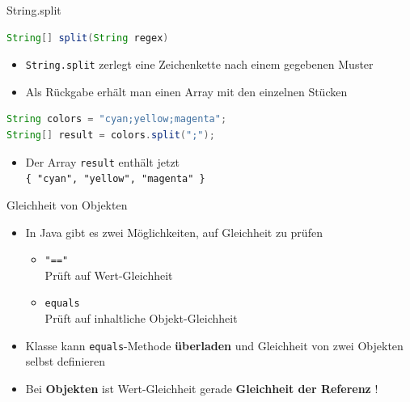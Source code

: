\documentclass[18pt]{beamer}
\begin{document}
\appendix
\beginbackup

\begin{frame}[fragile]{String.split}
    \begin{lstlisting}[language=Java]
String[] split(String regex)
    \end{lstlisting}


    \begin{itemize}
        \item \texttt{String.split} zerlegt eine Zeichenkette nach einem gegebenen Muster
        \item Als Rückgabe erhält man einen Array mit den einzelnen Stücken
    \end{itemize}

\begin{exampleblock}{}
    \begin{lstlisting}[language=Java,basicstyle=\scriptsize]
String colors = "cyan;yellow;magenta";
String[] result = colors.split(";");
    \end{lstlisting}
\end{exampleblock}

\begin{itemize}
    \item Der Array \texttt{result} enthält jetzt\\ \texttt{\{ "cyan", "yellow", "magenta" \}}
\end{itemize}

\end{frame}

\begin{frame}{Gleichheit von Objekten}
    \begin{itemize}
        \item In Java gibt es zwei Möglichkeiten, auf Gleichheit zu prüfen
        \begin{itemize}
            \item \texttt{"=="}\\
            Prüft auf Wert-Gleichheit

            \item \texttt{equals}\\
            Prüft auf inhaltliche Objekt-Gleichheit
        \end{itemize}
        \item Klasse kann \texttt{equals}-Methode \textbf{überladen} und Gleichheit von zwei Objekten selbst definieren
        \item \alert{Bei \textbf{Objekten} ist Wert-Gleichheit gerade \textbf{Gleichheit der Referenz} !}
    \end{itemize}
\end{frame}
\end{document}
